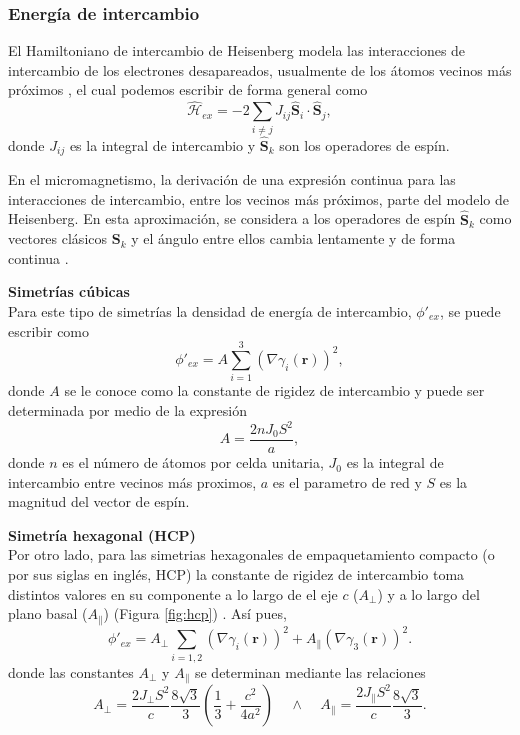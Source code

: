 \subsubsection{Energía de intercambio}
El Hamiltoniano de intercambio de Heisenberg modela las interacciones de intercambio de los electrones desapareados, usualmente de los átomos vecinos más próximos \cite{coey_2010}, el cual podemos escribir de forma general como \[ \hat{\mathcal{H}}_{ex} = - 2 \sum_{i \neq j} J_{ij} \hat{\mathbf{S}}_i \cdot \hat{\mathbf{S}}_j ,\] donde $J_{ij}$ es la integral de intercambio y $\hat{\mathbf{S}}_k$ son los operadores de espín.

\vspace{10pt}

En el micromagnetismo, la derivación de una expresión continua para las interacciones de intercambio, entre los vecinos más próximos, parte del modelo de Heisenberg. En esta aproximación, se considera a los operadores de espín $\hat{\mathbf{S}}_k$ como vectores clásicos $\mathbf{S}_k$ y el ángulo entre ellos cambia lentamente y de forma continua \cite{Exl2020}. 

\vspace{10pt}

\textbf{Simetrías cúbicas}\\
Para este tipo de simetrías la densidad de energía de intercambio, $\phi'_{ex}$, se puede escribir como \[ \phi'_{ex} = A \sum_{i=1}^3 (\nabla \gamma_i (\mathbf{r}) )^2 ,\] donde $A$ se le conoce como la constante de rigidez de intercambio y puede ser determinada por medio de la expresión \cite{kittel1949} \[ A = \frac{2nJ_0S^2}{a}, \]donde $n$ es el número de átomos por celda unitaria, $J_0$ es la integral de intercambio entre vecinos más proximos, $a$ es el parametro de red y $S$ es la magnitud del vector de espín.

\vspace{10pt}

\textbf{Simetría hexagonal (HCP)}\\
Por otro lado, para las simetrias hexagonales de empaquetamiento compacto (o por sus siglas en inglés, HCP) la constante de rigidez de intercambio toma distintos valores en su componente a lo largo de el eje $c$ ($A_\perp$) y a lo largo del plano basal ($A_\|$) (Figura \ref{fig:hcp}) \cite{KronmüllerMicromagnetism}. Así pues, \[ \phi'_{ex} = A_\perp \sum_{i=1,2} (\nabla \gamma_i (\mathbf{r}) )^2 + A_\| (\nabla \gamma_3 (\mathbf{r}) )^2.\] donde las constantes $A_\perp$ y $A_\|$ se determinan mediante las relaciones \[ A_\perp = \frac{2 J_\perp S^2}{c} \frac{8 \sqrt{3}}{3} \left( \frac{1}{3} + \frac{c^2}{4a^2}  \right) ~~~~~ \land ~~~~~ A_\| = \frac{2 J_\| S^2}{c} \frac{8 \sqrt{3}}{3}.\] 

